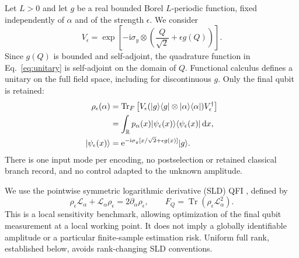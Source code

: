 \documentclass[aps,pra,reprint,amsmath,amssymb,nofootinbib,floatfix]{revtex4-2}
\newcommand{\Tr}{\operatorname{Tr}}
\newcommand{\dd}{\mathrm{d}}
\newcommand{\ii}{\mathrm{i}}
\newcommand{\ee}{\mathrm{e}}
\newcommand{\ket}[1]{\lvert #1\rangle}
\newcommand{\bra}[1]{\langle #1\rvert}
\begin{document}
Let $L>0$ and let $g$ be a real bounded Borel $L$-periodic function, fixed
independently of $\alpha$ and of the strength $\epsilon$. We consider
\begin{equation}
 V_\epsilon=\exp\left[-\ii\sigma_y\otimes
 \left(\frac{Q}{\sqrt2}+\epsilon g(Q)\right)\right].
 \label{eq:unitary}
\end{equation}
Since $g(Q)$ is bounded and self-adjoint, the quadrature function in
Eq.~\eqref{eq:unitary} is self-adjoint on the domain of $Q$.
Functional calculus defines a unitary on the full field space, including
for discontinuous $g$. Only the final qubit is retained:
\begin{align}
 \rho_\epsilon(\alpha)
 &=\Tr_F\left[V_\epsilon
 (\ket g\bra g\otimes\ket\alpha\bra\alpha)
 V_\epsilon^\dagger\right]\notag\\
 &=\int_{\mathbb R}p_\alpha(x)
 \ket{\psi_\epsilon(x)}\bra{\psi_\epsilon(x)}\,\dd x,
 \label{eq:state}\\
 \ket{\psi_\epsilon(x)}
 &=\ee^{-\ii\sigma_y[x/\sqrt2+\epsilon g(x)]}\ket g.
 \notag
\end{align}
There is one input mode per encoding, no postselection or retained
classical branch record, and no control adapted to the unknown amplitude.

We use the pointwise symmetric logarithmic derivative (SLD) QFI
\cite{braunstein1994}, defined by
\begin{equation}
 \rho_\epsilon\mathcal L_\alpha+
 \mathcal L_\alpha\rho_\epsilon=2\partial_\alpha\rho_\epsilon,
 \qquad F_Q=\Tr(\rho_\epsilon\mathcal L_\alpha^2).
 \label{eq:sld}
\end{equation}
This is a local sensitivity benchmark, allowing optimization of the final
qubit measurement at a local working point. It does not imply a globally
identifiable amplitude or a particular finite-sample estimation risk.
Uniform full rank, established below, avoids rank-changing SLD conventions.
\end{document}
